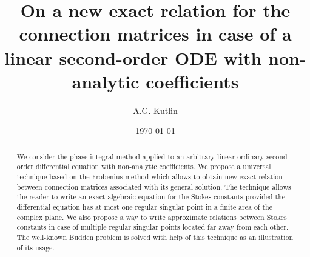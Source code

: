 \documentclass[aip,jmp,reprint]{revtex4-1}
\begin{document}
\title{On a new exact relation for the connection matrices in case of 
a linear second-order ODE with non-analytic coefficients}
\author{A.G. Kutlin}

\date{\today}

\begin{abstract}
We consider the phase-integral method applied to an arbitrary linear ordinary second-order differential 
equation with non-analytic coefficients. We propose a universal technique based on the Frobenius method 
which allows to obtain new exact relation between connection matrices associated with its general solution.
The technique allows the reader to write an exact algebraic equation for the Stokes constants provided 
the differential equation has at most one regular singular point in a finite area of the complex plane. 
We also propose a way to write approximate relations between Stokes constants in case of multiple regular 
singular points located far away from each other. The well-known Budden problem is solved with help of this 
technique as an illustration of its usage.
\end{abstract}


\maketitle
\end{document}
